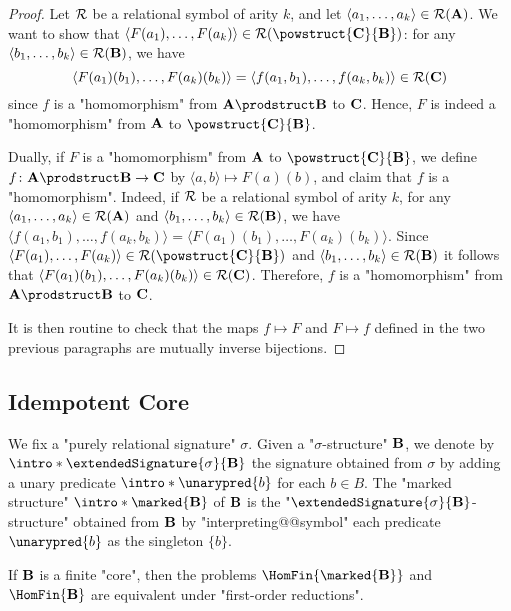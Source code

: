   \begin{proof}
	Let $\mathcal{R}$ be a relational symbol of arity $k$, and let
	$\langle a_1,\hdots,a_k \rangle \in \mathcal{R}(\mathbf{A})$.
	We want to show that $\langle F(a_1),\hdots,F(a_k) \rangle \in \+R(\powstruct{\?C}{\?B})$:
	for any $\langle b_1,\hdots,b_k \rangle \in \mathcal{R}(\mathbf{B})$, we have
	\[\langle F(a_1)(b_1), \hdots, F(a_k)(b_k)\rangle = \langle f(a_1,b_1),\hdots,f(a_k,b_k) \rangle \in \mathcal{R}(\mathbf{C})\] since $f$ is a "homomorphism" from $\?A\prodstruct \?B$ to $\mathbf{C}$.
	Hence, $F$ is indeed a "homomorphism" from $\mathbf{A}$ to $\powstruct{\?C}{\?B}$.
  
	Dually, if $F$ is a "homomorphism" from $\mathbf{A}$ to $\powstruct{\?C}{\?B}$,
	we define $f\colon \?A\prodstruct \?B \to \?C$ by $\langle a,b \rangle \mapsto F(a)(b)$,
	and claim that $f$ is a "homomorphism". Indeed, if $\mathcal{R}$ be a relational symbol of arity $k$,
	for any $\langle a_1, \hdots, a_k \rangle \in \mathcal{R}(\mathbf{A})$
	and $\langle b_1, \hdots, b_k \rangle \in \mathcal{R}(\mathbf{B})$,
	we have $\langle f(a_1,b_1), \hdots, f(a_k,b_k) \rangle
	= \langle F(a_1)(b_1), \hdots, F(a_k)(b_k) \rangle$.
	Since $\langle F(a_1), \hdots, F(a_k) \rangle \in \+R(\powstruct{\?C}{\?B})$
	and $\langle b_1, \hdots,b_k \rangle \in \mathcal{R}(\mathbf{B})$ 
	it follows that $\langle F(a_1)(b_1), \hdots, F(a_k)(b_k) \rangle \in \mathcal{R}(\mathbf{C})$.
	Therefore, $f$ is a "homomorphism" from $\?A \prodstruct \?B$ to $\mathbf{C}$.
  
	It is then routine to check that the maps $f \mapsto F$ and $F \mapsto f$ defined
	in the two previous paragraphs are mutually inverse bijections.
  \end{proof}

  \subsection{Idempotent Core}

  We fix a "purely relational signature" $\sigma$.
  Given a "$\sigma$-structure" $\mathbf{B}$,
  we denote by \AP$\intro*\extendedSignature{\sigma}{\?B}$
  the signature obtained from $\sigma$ by adding
  a unary predicate \AP$\intro*\unarypred{b}$ for each $b\in B$.
  The "marked structure" \AP$\intro*\marked{\?B}$ of $\mathbf{B}$ is the
  "$\extendedSignature{\sigma}{\?B}$-structure"
  obtained from $\mathbf{B}$ by "interpreting@@symbol" each predicate $\unarypred{b}$ as the
  singleton $\{b\}$.
  
  \begin{proposition}[Folklore]
	\AP\label{prop:marking-preserves-csp-complexity}
	If $\mathbf{B}$ is a finite "core", then the problems $\HomFin{\marked{\?B}}$ and 
	$\HomFin{\?B}$ are equivalent under "first-order reductions".
  \end{proposition}
  
